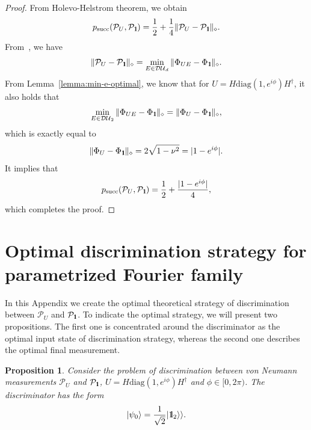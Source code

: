 \documentclass[preprint,12pt, a4paper, dvipsnames]{elsarticle}
\newcommand{\ket}[1]{\ensuremath{|#1\rangle}}
\newcommand{\1}{{\rm 1\hspace{-0.9mm}l}}
\newcommand{\Id}{{\rm 1\hspace{-0.9mm}l}}
\newcommand{\PP}{\mathcal{P}}
\newcommand{\diaguni}{\ensuremath{\mathcal{DU}}}
\newcommand{\diag}{\mathrm{diag}}
\newtheorem{proposition}{Proposition}
\begin{document}
\begin{proof}
	From Holevo-Helstrom theorem, we obtain
	\begin{equation}
	p_{\text{succ}}(\PP_{U}, \PP_{\Id}) = \frac{1}{2} + \frac{1}{4} \| \PP_{U} - \PP_{\Id} \|_\diamond.
	\end{equation}
	From~\cite[Theorem 1]{puchala2018strategies}, we have
	\begin{equation}
	\|\PP_U - \PP_\Id\|_\diamond = \min_{E \in \diaguni_d} \|\Phi_{UE} -
	\Phi_\Id\|_\diamond.
	\end{equation}
	From Lemma~\ref{lemma:min-e-optimal},  we know that for
	$U =  H \diag(1, e^{i \phi}) H^\dagger$,  it also holds that
	\begin{equation}
	\min_{E \in \diaguni_2} \|\Phi_{UE} -
	\Phi_\Id\|_\diamond = \|\Phi_{U} -
	\Phi_\Id\|_\diamond,
	\end{equation} which is exactly equal to
	\begin{equation}
	\|\Phi_{U} -
	\Phi_\Id\|_\diamond = 2\sqrt{1 - \nu^2} = |1-e^{i   \phi }|.
	\end{equation}
	It implies that
	\begin{equation}
	p_{\text{succ}}(\PP_{U}, \PP_{\Id}) = \frac{1}{2} + \frac{|1-e^{i \phi}|}{4},
	\end{equation} which completes the proof.
\end{proof}

\section{Optimal discrimination strategy for parametrized Fourier family} \label{app:optimal-strategy}


In this Appendix we create the optimal
theoretical strategy of  discrimination between $\PP_{U}$ and $\PP_{\Id}$.
To indicate the optimal strategy, we will present two propositions. The first one is concentrated around the discriminator as the optimal input state of discrimination strategy, whereas the second one describes the optimal final measurement.


\begin{proposition}\label{prop-discrim}
	Consider the problem of discrimination between von Neumann measurements $\PP_U$
	and $\PP_\1$, $U = H\diag(1, e^{i \phi}) H^\dagger $ and $\phi \in [0,
	2\pi)$.  The  discriminator has the form
	\begin{equation}
	\ket{\psi_{0}} = \frac{1}{\sqrt{2}} |\Id_2 \rangle \rangle.
	\end{equation}
\end{proposition}
\end{document}
